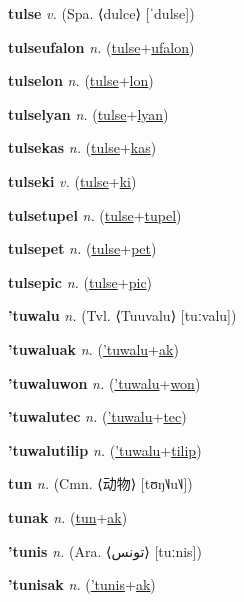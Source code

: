 \textbf{\hypertarget{tulse}{tulse}} \textit{v.} (Spa. ⟨dulce⟩ [ˈdulse])


\textbf{\hypertarget{tulseufalon}{tulseufalon}} \textit{n.} (\hyperlink{tulse}{tulse}+\allowbreak \hyperlink{ufalon}{ufalon})


\textbf{\hypertarget{tulselon}{tulselon}} \textit{n.} (\hyperlink{tulse}{tulse}+\allowbreak \hyperlink{lon}{lon})


\textbf{\hypertarget{tulselyan}{tulselyan}} \textit{n.} (\hyperlink{tulse}{tulse}+\allowbreak \hyperlink{lyan}{lyan})


\textbf{\hypertarget{tulsekas}{tulsekas}} \textit{n.} (\hyperlink{tulse}{tulse}+\allowbreak \hyperlink{kas}{kas})


\textbf{\hypertarget{tulseki}{tulseki}} \textit{v.} (\hyperlink{tulse}{tulse}+\allowbreak \hyperlink{ki}{ki})


\textbf{\hypertarget{tulsetupel}{tulsetupel}} \textit{n.} (\hyperlink{tulse}{tulse}+\allowbreak \hyperlink{tupel}{tupel})


\textbf{\hypertarget{tulsepet}{tulsepet}} \textit{n.} (\hyperlink{tulse}{tulse}+\allowbreak \hyperlink{pet}{pet})


\textbf{\hypertarget{tulsepic}{tulsepic}} \textit{n.} (\hyperlink{tulse}{tulse}+\allowbreak \hyperlink{pic}{pic})


\textbf{\hypertarget{'tuwalu}{'tuwalu}} \textit{n.} (Tvl. ⟨Tuuvalu⟩ [tuːvalu])


\textbf{\hypertarget{'tuwaluak}{'tuwaluak}} \textit{n.} (\hyperlink{'tuwalu}{'tuwalu}+\allowbreak \hyperlink{ak}{ak})


\textbf{\hypertarget{'tuwaluwon}{'tuwaluwon}} \textit{n.} (\hyperlink{'tuwalu}{'tuwalu}+\allowbreak \hyperlink{won}{won})


\textbf{\hypertarget{'tuwalutec}{'tuwalutec}} \textit{n.} (\hyperlink{'tuwalu}{'tuwalu}+\allowbreak \hyperlink{tec}{tec})


\textbf{\hypertarget{'tuwalutilip}{'tuwalutilip}} \textit{n.} (\hyperlink{'tuwalu}{'tuwalu}+\allowbreak \hyperlink{tilip}{tilip})


\textbf{\hypertarget{tun}{tun}} \textit{n.} (Cmn. ⟨{\chinese{}动物}⟩ [tʊŋ˥˩u˥˩])


\textbf{\hypertarget{tunak}{tunak}} \textit{n.} (\hyperlink{tun}{tun}+\allowbreak \hyperlink{ak}{ak})


\textbf{\hypertarget{'tunis}{'tunis}} \textit{n.} (Ara. ⟨{\arabics{}تونس}⟩ [tuːnis])


\textbf{\hypertarget{'tunisak}{'tunisak}} \textit{n.} (\hyperlink{'tunis}{'tunis}+\allowbreak \hyperlink{ak}{ak})


